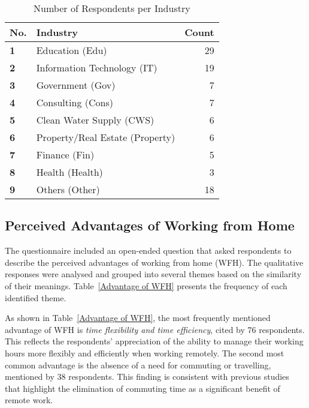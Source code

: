 \documentclass[a4paper, conference]{IEEEtran}
\begin{document}
\begin{table}[ht]
	\caption{Number of Respondents per Industry}
	\label{Respondent Industry}
	\begin{tabular}{|p{}|p{}|r|}
		\cline{1-3}
		\textbf{No.} & \textbf{Industry}      & \textbf{Count}   \\ \hline
		\textbf{1}  & Education (Edu)     & 29            \\ \hline
		\textbf{2}  & Information Technology (IT)         & 19 \\ \hline %
		\textbf{3}  & Government (Gov)     & 7             \\ \hline
		\textbf{4}  & Consulting (Cons)     & 7 \\ \hline %
		\textbf{5}  & Clean Water Supply (CWS) & 6          \\   \hline
		\textbf{6}  & Property/Real Estate (Property)     & 6             \\ \hline
		\textbf{7}  & Finance (Fin)     & 5             \\ \hline
		\textbf{8}  & Health (Health)    & 3             \\ \hline
		\textbf{9}  & Others (Other)       & 18 %
		\\ \hline
	\end{tabular}
\end{table}

\subsection{Perceived Advantages of Working from Home}
\label{sec:advantage-wfh}

The questionnaire included an open-ended question that asked respondents to describe the perceived advantages of working from home (WFH). The qualitative responses were analysed and grouped into several themes based on the similarity of their meanings. Table~\ref{Advantage of WFH} presents the frequency of each identified theme.

As shown in Table~\ref{Advantage of WFH}, the most frequently mentioned advantage of WFH is \textit{time flexibility and time efficiency}, cited by 76 respondents. This reflects the respondents' appreciation of the ability to manage their working hours more flexibly and efficiently when working remotely. The second most common advantage is the absence of a need for commuting or travelling, mentioned by 38 respondents. This finding is consistent with previous studies that highlight the elimination of commuting time as a significant benefit of remote work.
\end{document}
